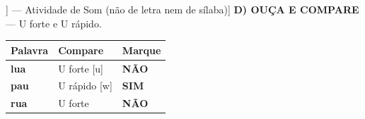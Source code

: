 \begin{exercicio}[Som /w/ [[w]] --- Atividade de Som (não de letra nem de sílaba)]
\textbf{D) OUÇA E COMPARE} --- U forte e U rápido.

\begin{center}
\begin{tabular}{@{}p{4.2cm}p{6.2cm}p{1.6cm}@{}}
\hline
\textbf{Palavra} & \textbf{Compare} & \textbf{Marque} \\
\hline
\textbf{lua} & U forte [u] & \textbf{NÃO} \\
\textbf{pau} & U rápido [w] & \textbf{SIM} \\
\textbf{rua} & U forte & \textbf{NÃO} \\
\hline
\end{tabular}
\end{center}

\end{exercicio}

